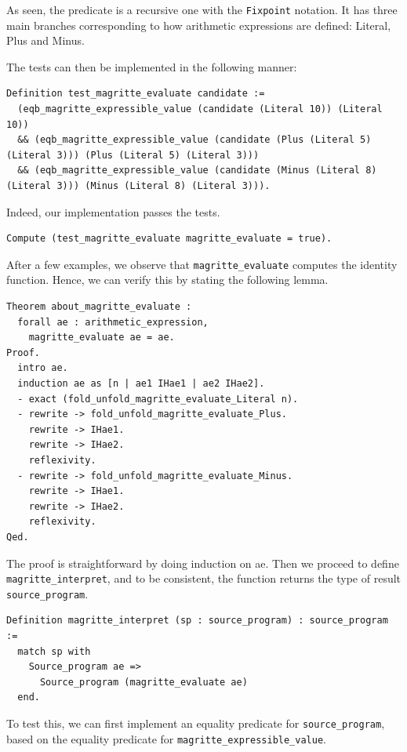 \documentclass{article}
\begin{document}
As seen, the predicate is a recursive one with the \texttt{Fixpoint} notation. It has three main branches corresponding to how arithmetic expressions are defined: Literal, Plus and Minus. 

The tests can then be implemented in the following manner:

\begin{lstlisting}
Definition test_magritte_evaluate candidate :=
  (eqb_magritte_expressible_value (candidate (Literal 10)) (Literal 10))
  && (eqb_magritte_expressible_value (candidate (Plus (Literal 5) (Literal 3))) (Plus (Literal 5) (Literal 3)))
  && (eqb_magritte_expressible_value (candidate (Minus (Literal 8) (Literal 3))) (Minus (Literal 8) (Literal 3))).
\end{lstlisting}

Indeed, our implementation passes the tests.

\begin{lstlisting}
Compute (test_magritte_evaluate magritte_evaluate = true).
\end{lstlisting}

After a few examples, we observe that \texttt{magritte\_evaluate} computes the identity function. Hence, we can verify this by stating the following lemma.
\begin{lstlisting}
Theorem about_magritte_evaluate :
  forall ae : arithmetic_expression,
    magritte_evaluate ae = ae.
Proof.
  intro ae.
  induction ae as [n | ae1 IHae1 | ae2 IHae2].
  - exact (fold_unfold_magritte_evaluate_Literal n).
  - rewrite -> fold_unfold_magritte_evaluate_Plus.
    rewrite -> IHae1.
    rewrite -> IHae2.
    reflexivity.
  - rewrite -> fold_unfold_magritte_evaluate_Minus.
    rewrite -> IHae1.
    rewrite -> IHae2.
    reflexivity.
Qed.
\end{lstlisting}

The proof is straightforward by doing induction on ae. Then we proceed to define \texttt{magritte\_interpret}, and to be consistent, the function returns the type of result \texttt{source\_program}. 
\begin{lstlisting}
Definition magritte_interpret (sp : source_program) : source_program :=
  match sp with
    Source_program ae =>
      Source_program (magritte_evaluate ae)
  end.
\end{lstlisting}

To test this, we can first implement an equality predicate for \texttt{source\_program}, based on the equality predicate for \texttt{magritte\_expressible\_value}.
\end{document}
